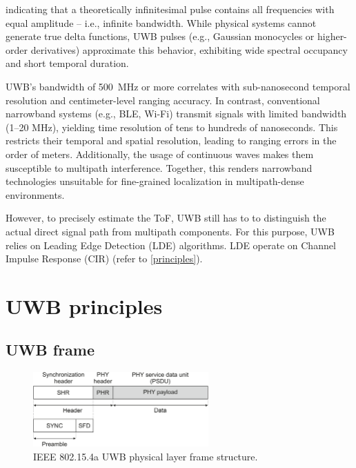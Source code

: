 indicating that a theoretically infinitesimal pulse contains all frequencies with equal amplitude -- i.e., infinite bandwidth. While physical systems cannot generate true delta functions, UWB pulses (e.g., Gaussian monocycles or higher-order derivatives) approximate this behavior, exhibiting wide spectral occupancy and short temporal duration.


UWB's bandwidth of \SI{500}{\mega\hertz} or more correlates with sub-nanosecond temporal resolution and centimeter-level ranging accuracy. In contrast, conventional narrowband systems (e.g., BLE, Wi-Fi) transmit signals with limited bandwidth (1–20 \si{\mega\hertz}), yielding time resolution of tens to hundreds of nanoseconds. This restricts their temporal and spatial resolution, leading to ranging errors in the order of meters. %
Additionally, the usage of continuous waves makes them susceptible to multipath interference. Together, this renders narrowband technologies unsuitable for fine-grained localization in multipath-dense environments.

However, to precisely estimate the ToF, UWB still has to to distinguish the actual direct signal path from multipath components. For this purpose, UWB relies on Leading Edge Detection (LDE) algorithms. LDE operate on Channel Impulse Response (CIR) (refer to \autoref{principles}).

\section{UWB principles}\label{principles}
\subsection{UWB frame}

\begin{figure}[tbh]
\includegraphics[width=0.6\textwidth]{Graphics/uwb_phy.pdf}
\centering
\caption{IEEE 802.15.4a UWB physical layer frame structure.}
\label{fig:phy}
\end{figure}

